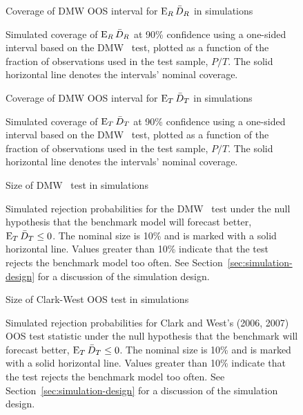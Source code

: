 \documentclass[12pt]{article}
\begin{document}
\insamplecoefs
\insampletests


\begin{figure}\centering
  {\large Coverage of DMW OOS interval for $\operatorname{E}_R\bar{D}_{R}$ in simulations}
  \caption{Simulated coverage of $\operatorname{E}_R \bar{D}_{R}$ at 90\% confidence using
    a one-sided interval based on the DMW \oost\ test, plotted as a
    function of the fraction of observations used in the test sample,
    $P/T$. The solid horizontal line denotes the intervals' nominal
    coverage.}
 \label{fig:interval-R}
\end{figure}
\clearpage

\begin{figure}\centering
  {\large Coverage of DMW OOS interval for $\operatorname{E}_T\bar{D}_{T}$ in simulations}
  \caption{Simulated coverage of $\operatorname{E}_T \bar{D}_{T}$ at 90\% confidence using
    a one-sided interval based on the DMW \oost\ test, plotted as a
    function of the fraction of observations used in the test sample,
    $P/T$.  The solid horizontal line denotes the intervals' nominal
    coverage.}
  \label{fig:interval-T}
\end{figure}
\clearpage

\begin{figure}\centering
  {\large Size of DMW \oost\ test in simulations}
  \caption{Simulated rejection probabilities for the DMW \oost\ test
    under the null hypothesis that the benchmark model will forecast
    better, $\operatorname{E}_T \bar{D}_{T} \leq 0$. The nominal size is 10\% and is
    marked with a solid horizontal line. Values greater than 10\%
    indicate that the test rejects the benchmark model too often. See
    Section~\ref{sec:simulation-design} for a discussion of the
    simulation design.}
  \label{fig:ttest-size}
\end{figure}
\clearpage

\begin{figure}\centering
  {\large Size of Clark-West OOS test in simulations}
  \caption{Simulated rejection probabilities for Clark and West's
    (2006, 2007) OOS test statistic under the null hypothesis that the
    benchmark will forecast better, $\operatorname{E}_T \bar{D}_{T} \leq 0$. The nominal
    size is 10\% and is marked with a solid horizontal line. Values
    greater than 10\% indicate that the test rejects the benchmark
    model too often. See Section~\ref{sec:simulation-design} for a
    discussion of the simulation design.}
   \label{fig:clarkwest}
\end{figure}
\clearpage
\end{document}
